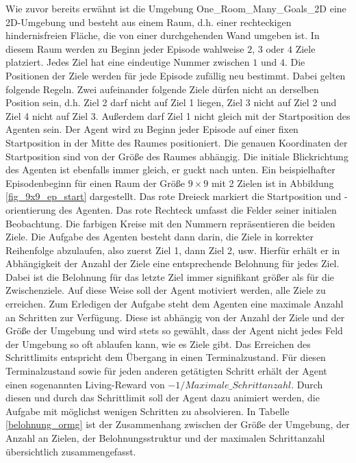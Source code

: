 Wie zuvor bereits erwähnt ist die Umgebung \glqq One\_Room\_Many\_Goals\_2D\grqq{} eine 2D-Umgebung und besteht aus einem Raum, d.h. einer rechteckigen hindernisfreien Fläche, die von einer durchgehenden Wand umgeben ist. In diesem Raum werden zu Beginn jeder Episode wahlweise $2$, $3$ oder $4$ Ziele platziert. Jedes Ziel hat eine eindeutige Nummer zwischen $1$ und $4$. Die Positionen der Ziele werden für jede Episode zufällig neu bestimmt. Dabei gelten folgende Regeln. Zwei aufeinander folgende Ziele dürfen nicht an derselben Position sein, d.h. Ziel 2 darf nicht auf Ziel 1 liegen, Ziel 3 nicht auf Ziel 2 und Ziel 4 nicht auf Ziel 3. Außerdem darf Ziel 1 nicht gleich mit der Startposition des Agenten sein. Der Agent wird zu Beginn jeder Episode auf einer fixen Startposition in der Mitte des Raumes positioniert. Die genauen Koordinaten der Startposition sind von der Größe des Raumes abhängig. Die initiale Blickrichtung des Agenten ist ebenfalls immer gleich, er guckt nach unten. Ein beispielhafter Episodenbeginn für einen Raum der Größe $9 \times 9$ mit 2 Zielen ist in Abbildung \ref{fig_9x9_ep_start} dargestellt. Das rote Dreieck markiert die Startposition und -orientierung des Agenten. Das rote Rechteck umfasst die Felder seiner initialen Beobachtung. Die farbigen Kreise mit den Nummern repräsentieren die beiden Ziele. Die Aufgabe des Agenten besteht dann darin, die Ziele in korrekter Reihenfolge abzulaufen, also zuerst Ziel 1, dann Ziel 2, usw. Hierfür erhält er in Abhängigkeit der Anzahl der Ziele eine entsprechende Belohnung für jedes Ziel. Dabei ist die Belohnung für das letzte Ziel immer signifikant größer als für die Zwischenziele. Auf diese Weise soll der Agent motiviert werden, alle Ziele zu erreichen. Zum Erledigen der Aufgabe steht dem Agenten eine maximale Anzahl an Schritten zur Verfügung. Diese ist abhängig von der Anzahl der Ziele und der Größe der Umgebung und wird stets so gewählt, dass der Agent nicht jedes Feld der Umgebung so oft ablaufen kann, wie es Ziele gibt. Das Erreichen des Schrittlimits entspricht dem Übergang in einen Terminalzustand. Für diesen Terminalzustand sowie für jeden anderen getätigten Schritt erhält der Agent einen sogenannten Living-Reward von $-1 / Maximale\_Schrittanzahl$. Durch diesen und durch das Schrittlimit soll der Agent dazu animiert werden, die Aufgabe mit möglichst wenigen Schritten zu absolvieren. In Tabelle \ref{belohnung_ormg} ist der Zusammenhang zwischen der Größe der Umgebung, der Anzahl an Zielen, der Belohnungsstruktur und der maximalen Schrittanzahl übersichtlich zusammengefasst.

